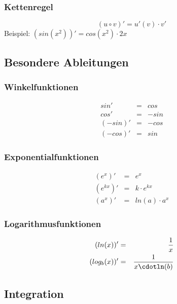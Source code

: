 \documentclass[a4paper,11pt]{article}
\begin{document}
	\subsubsection{Kettenregel}
	\label{ssub:kettenregel}
	\begin{equation}
		(u \circ v)' = u'(v) \cdot v'
	\end{equation}
	Beispiel: $(sin(x^2))' = cos(x^2) \cdot 2x$
	
	\subsection{Besondere Ableitungen} %
	\label{sub:besondere_ableitungen}
	
	\subsubsection{Winkelfunktionen}
	\label{ssub:winkelfunktionen}	
	\begin{eqnarray}
		sin' &=& cos \\
		cos' &=& -sin \\
		(-sin)' &=& -cos \\
		(-cos)' &=& sin
	\end{eqnarray}
	
	\subsubsection{Exponentialfunktionen}
	\label{ssub:exponentialfunktionen}	
	\begin{eqnarray}
		(e^x)' &=& e^x \\
		(e^{kx})' &=& k \cdot e^{kx} \\
		(a^x)' &=& ln(a) \cdot a^x
	\end{eqnarray}
	
	\subsubsection{Logarithmusfunktionen}
	\label{ssub:exponentialfunktionen}	
	\begin{eqnarray}
		(ln(x))' &=& \frac{1}{x} \\
		(log_b(x))' &=& \frac{1}{x\cdotln(b)}
	\end{eqnarray}	
	
	
	\subsection{Integration} %
	\label{sub:integration}
	
\end{document}
